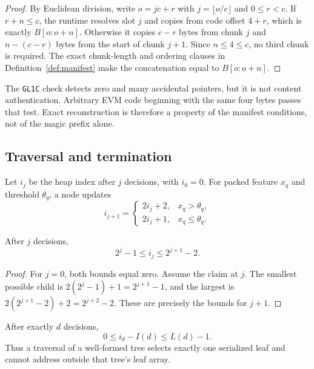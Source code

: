 \begin{proof}
By Euclidean division, write $o=jc+r$ with
$j=\lfloor o/c\rfloor$ and $0\le r<c$.  If $r+n\le c$, the runtime resolves
slot $j$ and copies from code offset $4+r$, which is exactly
$B[o:o+n]$.  Otherwise it copies $c-r$ bytes from chunk $j$ and
$n-(c-r)$ bytes from the start of chunk $j+1$.  Since $n\le4\le c$, no third
chunk is required.  The exact chunk-length and ordering clauses in
Definition~\ref{def:manifest} make the concatenation equal to $B[o:o+n]$.
\end{proof}

\begin{remark}
The \texttt{GL1C} check detects zero and many accidental pointers, but it is
not content authentication.  Arbitrary EVM code beginning with the same four
bytes passes that test.  Exact reconstruction is therefore a property of the
manifest conditions, not of the magic prefix alone.
\end{remark}

\subsection{Traversal and termination}

Let $i_j$ be the heap index after $j$ decisions, with $i_0=0$.  For packed
feature $x_q$ and threshold $\theta_q$, a node updates
\begin{equation}
 i_{j+1} =
 \begin{cases}
  2i_j+2, & x_q>\theta_q,\\
  2i_j+1, & x_q\le\theta_q.
 \end{cases}
 \label{eq:index-update}
\end{equation}

\begin{lemma}
\label{lem:traversal-interval}
After $j$ decisions,
\begin{equation}
  2^j-1\le i_j\le2^{j+1}-2.
  \label{eq:index-interval}
\end{equation}
\end{lemma}

\begin{proof}
For $j=0$, both bounds equal zero.  Assume the claim at $j$.
The smallest possible child is
$2(2^j-1)+1=2^{j+1}-1$, and the largest is
$2(2^{j+1}-2)+2=2^{j+2}-2$.  These are precisely the bounds for $j+1$.
\end{proof}

\begin{corollary}
\label{cor:leaf-safety}
After exactly $d$ decisions,
\[
  0\le i_d-I(d)\le L(d)-1.
\]
Thus a traversal of a well-formed tree selects exactly one serialized leaf and
cannot address outside that tree's leaf array.
\end{corollary}

